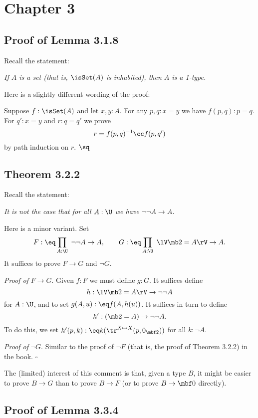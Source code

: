 \documentclass[12pt]{article}
\begin{document}
\section{Chapter 3}

\subsection{Proof of Lemma 3.1.8}\label{318}

Recall the statement: 

\emph{If $A$ is a set (that is, $\isSet(A)$ is inhabited), then $A$ is a 1-type.} 

Here is a slightly different wording of the proof:

Suppose $f:\isSet(A)$ and let $x,y:A$. For any $p,q:x=y$ we have $f(p,q):p=q$. For $q':x=y$ and $r:q=q'$ we prove 
$$
r=f(p,q)^{-1}\cc f(p,q')
$$ 
by path induction on $r$. $\sq$


\subsection{Theorem 3.2.2} 

Recall the statement:

\nn\emph{It is not the case that for all $A:\U$ we have $\neg\neg A\to A$.}

Here is a minor variant. Set 
$$
F:\eq\prod_{A:\U}\ \neg\neg A\to A,\qquad G:\eq\prod_{A:\U}\ \lV\mb2=A\rV\to A.
$$ 
It suffices to prove $F\to G$ and $\neg G$. 

\nn\emph{Proof of} $F\to G$. Given $f:F$ we must define $g:G$. It suffices define 
$$
h:\lV\mb2=A\rV\to\neg\neg A
$$ 
for $A:\U$, and to set $g(A,u):\eq f(A,h(u))$. It suffices in turn to define 
$$
h':(\mb2=A)\to\neg\neg A.
$$ 
To do this, we set $h'(p,k):\eq k(\tr^{X\mapsto X}(p,0_{\mbf2}))$ for all $k:\neg A$. 

\nn\emph{Proof of} $\neg G$. Similar to the proof of $\neg F$ (that is, the proof of Theorem 3.2.2) in the book. $\square$

The (limited) interest of this comment is that, given a type $B$, it might be easier to prove $B\to G$ than to prove $B\to F$ (or to prove $B\to\mbf0$ directly). 


\subsection{Proof of Lemma 3.3.4}%
\end{document}
